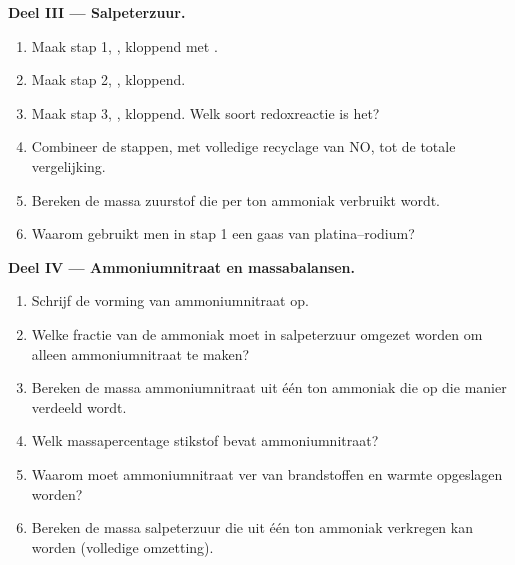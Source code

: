 \begin{problem}
\medskip
\noindent\textbf{Deel III --- Salpeterzuur.}
\begin{enumerate}[resume]
  \item Maak stap 1, , kloppend met . %
  \item Maak stap 2, , kloppend. %
  \item Maak stap 3, , kloppend. Welk soort %
        redoxreactie is het?
  \item Combineer de stappen, met volledige recyclage van NO, tot de
        totale vergelijking.
  \item Bereken de massa zuurstof die per ton ammoniak verbruikt wordt.
  \item Waarom gebruikt men in stap 1 een gaas van platina--rodium?
\end{enumerate}

\medskip
\noindent\textbf{Deel IV --- Ammoniumnitraat en massabalansen.}
\begin{enumerate}[resume]
  \item Schrijf de vorming van ammoniumnitraat op.
  \item Welke fractie van de ammoniak moet in salpeterzuur omgezet worden
        om alleen ammoniumnitraat te maken?
  \item Bereken de massa ammoniumnitraat uit één ton ammoniak die op die
        manier verdeeld wordt.
  \item Welk massapercentage stikstof bevat ammoniumnitraat?
  \item Waarom moet ammoniumnitraat ver van brandstoffen en warmte
        opgeslagen worden?
  \item Bereken de massa salpeterzuur die uit één ton ammoniak verkregen
        kan worden (volledige omzetting).
\end{enumerate}
\end{problem}
